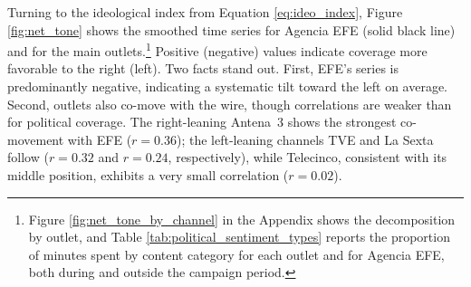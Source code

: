 \documentclass[12pt]{article}
\begin{document}
	
	








Turning to the ideological index from Equation \ref{eq:ideo_index}, Figure \ref{fig:net_tone} shows the smoothed time series for Agencia EFE (solid black line) and for the main outlets.\footnote{Figure \ref{fig:net_tone_by_channel} in the Appendix shows the decomposition by outlet, and Table \ref{tab:political_sentiment_types} reports the proportion of minutes spent by content category for each outlet and for Agencia EFE, both during and outside the campaign period.} Positive (negative) values indicate coverage more favorable to the right (left). Two facts stand out. {First}, EFE’s series is predominantly negative, indicating a systematic tilt toward the left on average. {Second}, outlets also co-move with the wire, though correlations are weaker than for political coverage. The right-leaning Antena~3 shows the strongest co-movement with EFE ($r=0.36$); the left-leaning channels TVE and La Sexta follow ($r=0.32$ and $r=0.24$, respectively), while Telecinco, consistent with its middle position, exhibits a very small correlation ($r=0.02$).
\end{document}

